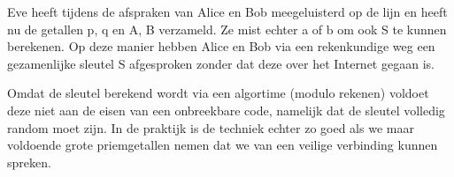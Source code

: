 Eve heeft tijdens de afspraken van Alice en Bob meegeluisterd op de lijn en heeft nu de getallen p, q en A, B verzameld. Ze mist echter a of b om ook S te kunnen berekenen. Op deze manier hebben Alice en Bob via een rekenkundige weg een gezamenlijke sleutel S afgesproken zonder dat deze over het Internet gegaan is.

Omdat de sleutel berekend wordt via een algortime (modulo rekenen) voldoet deze niet aan de eisen van een onbreekbare code, namelijk dat de sleutel volledig random moet zijn. In de praktijk is de techniek echter zo goed als we maar voldoende grote priemgetallen nemen dat we van een veilige verbinding kunnen spreken.
